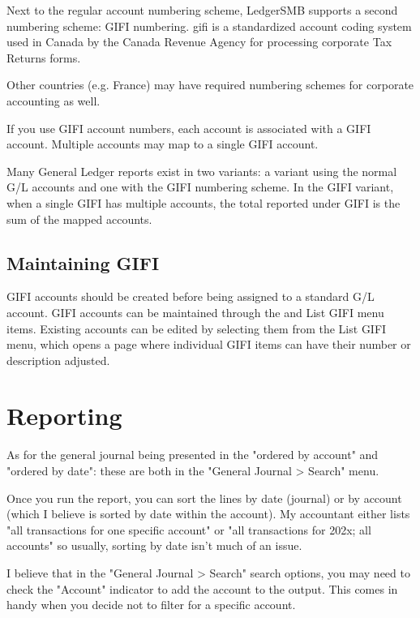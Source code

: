 Next to the regular account numbering scheme, LedgerSMB supports a second
numbering scheme: GIFI numbering. \gls{gifi} is a standardized account 
coding system used in Canada by the Canada Revenue Agency for processing
corporate Tax Returns forms. 

Other countries (e.g. France) may have required numbering schemes for
corporate accounting as well.

If you use GIFI account numbers, each account is associated with a GIFI
account. Multiple accounts may map to a single GIFI account.

Many General Ledger reports exist in two variants: a variant using the
normal G/L accounts and one with the GIFI numbering scheme. In the GIFI
variant, when a single GIFI has multiple accounts, the total reported
under GIFI is the sum of the mapped accounts.


\subsection{Maintaining GIFI}
\label{subsec-coa-gifi-maintenance}

GIFI accounts should be created before being assigned to a standard G/L account. GIFI accounts
can be maintained through the  and List GIFI menu items. Existing accounts can be edited by selecting them from the List GIFI menu, which opens a page where individual GIFI items can have their number or
description adjusted.

\section{Reporting}
\label{sec-coa-reporting}

As for the general journal being presented in the "ordered by account" and "ordered by date": these are both in the "General Journal > Search" menu. 

Once you run the report, you can sort the lines by date (journal) or by account (which I believe is sorted by date within the account).
My accountant either lists "all transactions for one specific account" or "all transactions for 202x; all accounts"
so usually, sorting by date isn't much of an issue.

I believe that in the "General Journal > Search" search options, you may need to check the "Account" indicator to add the account to the output. This comes in handy when you decide not to filter for a specific account.

